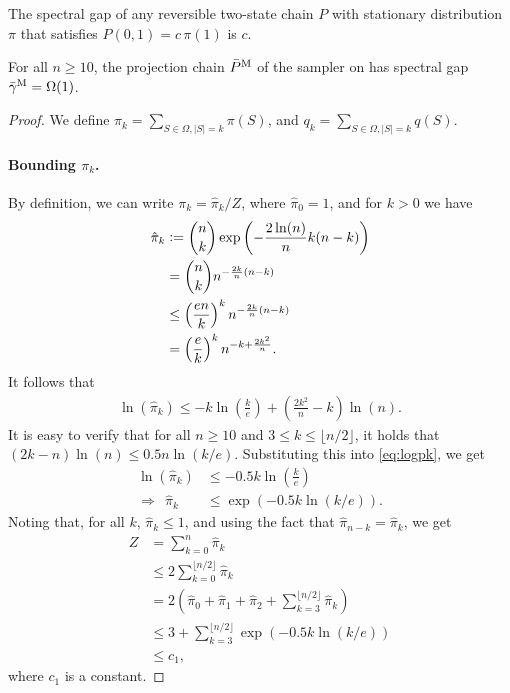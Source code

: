 \let\oldthelemma\thelemma
\renewcommand{\thelemma}{B1}
\begin{lemma}  \label{lem:anari}
  The spectral gap of any reversible two-state chain $P$ with stationary distribution $\pi$ that satisfies $P(0, 1) = c\,\pi(1)$ is $c$.
\end{lemma}
\let\thelemma\oldthelemma

\setcounter{lemma}{0}
\begin{lemma}
  For all $n \geq 10$, the projection chain $\bar{P}^{\mathrm{M}}$ of the \Ms{} sampler on \ising{} has spectral gap $\bar{\gamma}^{\mathrm{M}} = \Omega(1)$.
\end{lemma}

\begin{proof}
We define $\pi_k = \sum_{S \in \Omega, |S| = k} \pi(S)$, and $q_k = \sum_{S \in \Omega, |S| = k} q(S)$.

\paragraph{Bounding $\pi_k$.}
By definition, we can write $\pi_k = \hat{\pi}_k / Z$, where $\hat{\pi}_0 = 1$, and for $k > 0$ we have
\begin{align*}
\hat{\pi}_k &\vcentcolon= \binom{n}{k} \exp\left(-\frac{2\ln(n)}{n} k(n-k)\right)\\
            &= \binom{n}{k} n^{-\frac{2k}{n} (n-k)}\\
            &\leq \left(\frac{en}{k}\right)^k n^{-\frac{2k}{n} (n-k)}\\
            &= \left(\frac{e}{k}\right)^k n^{-k + \frac{2k^2}{n}}.
\end{align*}
It follows that
\begin{align} \label{eq:logpk}
  \ln(\hat{\pi}_k) \leq -k \ln\left(\frac{k}{e}\right) + \left(\frac{2k^2}{n} - k\right)\ln(n).
\end{align}
It is easy to verify that for all $n \geq 10$ and $3 \leq k \leq \lfloor n/2 \rfloor$, it holds that $(2k-n)\ln(n) \leq 0.5n\ln(k/e)$.
Substituting this into \eqref{eq:logpk}, we get
\begin{align*}
            \ln(\hat{\pi}_k) &\leq -0.5k\ln\left(\frac{k}{e}\right)\\
  \Rightarrow\ \ \hat{\pi}_k &\leq \exp(-0.5k\ln(k/e)).
\end{align*}
Noting that, for all $k$, $\hat{\pi}_k \leq 1$, and using the fact that $\hat{\pi}_{n-k} = \hat{\pi}_k$, we get
\begin{align}
  Z &= \sum_{k = 0}^n \hat{\pi}_k \nonumber\\ 
    &\leq 2\sum_{k = 0}^{\lfloor n/2 \rfloor} \hat{\pi}_ k\nonumber\\
    &= 2(\hat{\pi}_0 + \hat{\pi}_1 + \hat{\pi}_2 + \sum_{k = 3}^{\lfloor n/2 \rfloor} \hat{\pi}_k) \nonumber\\
    &\leq 3 + \sum_{k = 3}^{\lfloor n/2 \rfloor} \exp(-0.5k\ln(k/e)) \nonumber\\
    &\leq c_1, \label{eq:Zconst}
\end{align}
where $c_1$ is a constant.


\end{proof}
